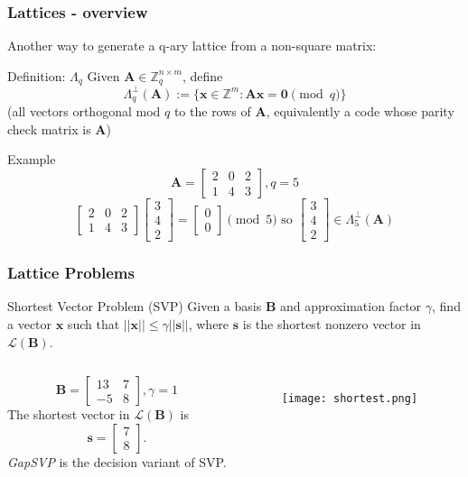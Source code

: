 \documentclass{beamer}
\renewcommand{\v}{\mathbf}
\begin{document}
\begin{frame}
\frametitle{Lattices - overview}
Another way to generate a q-ary lattice from a non-square matrix:
\begin{block}{Definition: $\Lambda_q$}
Given $\v{A} \in \mathbb{Z}_q^{n \times m}$, define
\begin{equation*}
    \Lambda_q^\perp(\v{A}) := \{\v{x} \in \mathbb{Z}^m: \v{Ax} = \v{0}
        \pmod{q}
    \}
\end{equation*}
(all vectors orthogonal mod $q$ to the rows of $\v{A}$, equivalently
a code whose parity check matrix is $\v{A}$)
\end{block}
\begin{block}{Example}
\begin{equation*}
    \v{A} = \begin{bmatrix} 2 & 0 & 2 \\ 1 & 4 & 3 \end{bmatrix}, q=5
\end{equation*}
\begin{equation*}
    \begin{bmatrix} 2 & 0 & 2 \\ 1 & 4 & 3 \end{bmatrix}
    \begin{bmatrix} 3 \\ 4 \\ 2 \end{bmatrix}
    = \begin{bmatrix} 0 \\ 0 \end{bmatrix} \pmod{5}
    \text{ so } \begin{bmatrix} 3 \\ 4 \\ 2 \end{bmatrix} \in 
    \Lambda_5^\perp(\v{A})
\end{equation*}
\end{block}
\end{frame}

\begin{frame}
\frametitle{Lattice Problems}
\begin{block}{Shortest Vector Problem (SVP)}
Given a basis $\v{B}$ and approximation factor $\gamma$, find a vector 
$\v{x}$ such that $||\v{x}|| \leq \gamma||\v{s}||$, where $\v{s}$ is
the shortest nonzero vector in $\mathcal{L}(\v{B})$.
\end{block}
\begin{columns}
\[
    \v{B} = \begin{bmatrix}13 & 7 \\ -5 & 8 \end{bmatrix},
    \gamma = 1
\]
The shortest vector in $\mathcal{L}(\v{B})$ is
\[
    \v{s} = \begin{bmatrix} 7 \\ 8 \end{bmatrix}.
\]
\textit{GapSVP} is the decision variant of SVP.
\begin{figure}
    \texttt{[image: shortest.png]}
\end{figure}
\end{columns}
\end{frame}
\end{document}
